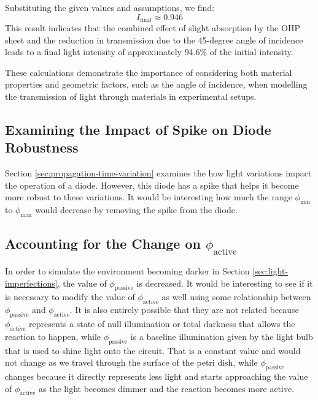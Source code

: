 Substituting the given values and assumptions, we find:
\[ I_{\text{final}} \approx 0.946 \]
This result indicates that the combined effect of slight absorption by the OHP sheet and the reduction in transmission due to the 45-degree angle of incidence leads to a final light intensity of approximately 94.6\% of the initial intensity.

These calculations demonstrate the importance of considering both material properties and geometric factors, such as the angle of incidence, when modelling the transmission of light through materials in experimental setups.


\subsection{Examining the Impact of Spike on Diode Robustness}
Section \ref{sec:propagation-time-variation} examines the how light variations impact the operation of a diode.
However, this diode has a spike that helps it become more robust to these variations. It would be interesting how much 
the range $\phi_{\text{min}}$ to $\phi_{\text{max}}$ would decrease by removing the spike from the diode.



\subsection{Accounting for the Change on $\phi_{\text{active}}$}
In order to simulate the environment becoming darker in Section \ref{sec:light-imperfections}, the value of $\phi_{\text{passive}}$ is decreased.
It would be interesting to see if it is necessary to modify the value of $\phi_{\text{active}}$ as well using some relationship between
$\phi_{\text{passive}}$ and $\phi_{\text{active}}$.
It is also entirely possible that they are not related because $\phi_{\text{active}}$ represents a state of null illumination or total darkness that allows the reaction to happen, while $\phi_{\text{passive}}$ is a baseline illumination given by the light bulb 
that is used to shine light onto the circuit. That is a constant value and would not change as we travel through the surface of the petri dish, while $\phi_{\text{passive}}$ changes 
because it directly represents less light and starts approaching the value of $\phi_{\text{active}}$ as the light becomes dimmer and the reaction becomes more active.


